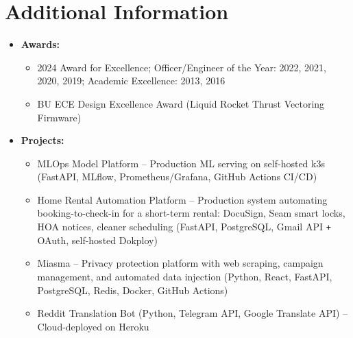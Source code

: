\documentclass[10pt]{extarticle}
\begin{document}

\section{Additional Information} 
\begin{itemize}
    \itemsep0.1em
    \item \textbf{Awards: }
    \vspace{-\topsep}
    \begin{itemize}
        \itemsep0em
        \item 2024 Award for Excellence; Officer/Engineer of the Year: 2022, 2021, 2020, 2019; Academic Excellence: 2013, 2016
        \item BU ECE Design Excellence Award (Liquid Rocket Thrust Vectoring Firmware)
    \end{itemize}
    \item \textbf{Projects: }
    \vspace{-\topsep} \vspace{0.2em}
    \begin{itemize}
        \itemsep0em
        \item MLOps Model Platform -- Production ML serving on self-hosted k3s (FastAPI, MLflow, Prometheus/Grafana, GitHub Actions CI/CD)
        \item Home Rental Automation Platform -- Production system automating booking-to-check-in for a short-term rental: DocuSign, Seam smart locks, HOA notices, cleaner scheduling (FastAPI, PostgreSQL, Gmail API \verb!+! OAuth, self-hosted Dokploy)
        \item Miasma -- Privacy protection platform with web scraping, campaign management, and automated data injection (Python, React, FastAPI, PostgreSQL, Redis, Docker, GitHub Actions)
        \item Reddit Translation Bot (Python, Telegram API, Google Translate API) -- Cloud-deployed on Heroku
    \end{itemize} \end{itemize} 

\end{document}
